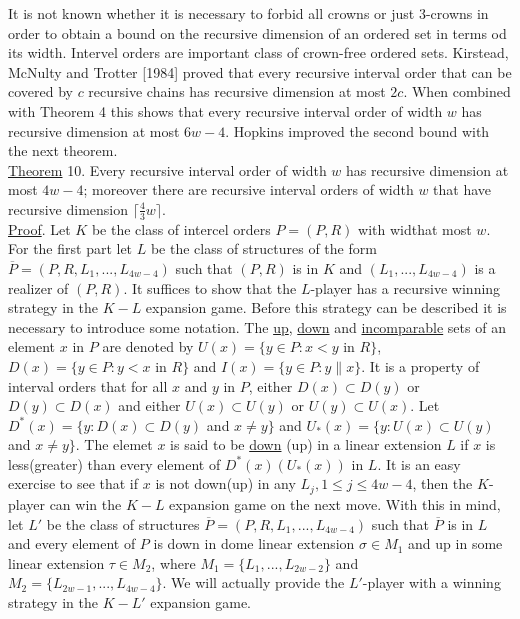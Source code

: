 \documentclass[twoside]{article}
\begin{document}
It is not known whether it is necessary to forbid all crowns or just 3-crowns in order to obtain a bound
on the recursive dimension of an ordered set in terms od its width. Intervel orders are important class of
crown-free ordered sets. Kirstead, McNulty and Trotter [1984] proved that every recursive interval order
that can be covered by $c$ recursive chains has recursive dimension at most $2c$. When combined with
Theorem 4 this shows that every recursive interval order of width $w$ has recursive dimension at most 
$6w-4$. Hopkins improved the second bound with the next theorem.\\
%
%
\newline
\underline{Theorem} 10. \cite{Hopkins81} Every recursive interval order of width $w$ has recursive dimension
at most $4w-4$; moreover there are recursive interval orders of width $w$ that have recursive dimension
$\lceil {\frac 4 3}w \rceil$.\\
\newline
\underline{Proof}. Let $K$ be the class of intercel orders $P =(P,R)$ with widthat most $w$.
For the first part let $L$ be the class of structures of the form $\overline{P}=(P,R,L_1,...,L_{4w-4})$
such that $(P,R)$ is in $K$ and $(L_1,...,L_{4w-4})$ is a realizer of $(P,R)$. It suffices to show that the $L$-player has a recursive winning
strategy in the $K-L$ expansion game. Before this strategy can be described it is necessary
to introduce some notation. The \underline{up}, \underline{down} and \underline{incomparable}
sets of an element $x$ in $P$ are denoted by $U(x) =\{y\in P: x<y$ in $R\}$,
$D(x)=\{y \in P:y<x$ in $R\}$ and $I(x) =\{y\in P: y\parallel x\}$. It is a property of interval
orders that for all $x$ and $y$ in $P$, either $D(x) \subset D(y)$ or $D(y) \subset D(x)$
and either $U(x) \subset U(y)$ or $U(y) \subset U(x)$. Let 
$D^*(x) = \{y: D(x) \subset D(y)$ and $ x\neq y\}$ and $U_*(x) =\{ y: U(x) \subset U(y)$ and $x \neq y\}$.
The elemet $x$ is said to be \underline{down} (up) in  a linear extension $L$ if $x$ is less(greater)
than every element of $D^*(x) (U_*(x))$ in $L$. It is an easy exercise to see that if $x$ is not down(up)
in any $L_j, 1\leq j\leq 4w-4$, then the $K$-player can win the $K-L$ expansion game on the next move.
With this in mind, let $L'$ be the class of structures $\overline{P}=(P,R,L_1,...,L_{4w-4})$ such that
$\overline{P}$ is in $L$ and every element of $P$ is down in dome linear extension $\sigma \in M_1$
and up in some linear extension $\tau \in M_2$, where $M_1 = \{L_1,...,L_{2w-2}\}$ and
$M_2 = \{L_{2w-1},...,L_{4w-4}\}$. We will actually provide the $L'$-player with a winning strategy in
the $K-L'$ expansion game.
\end{document}
